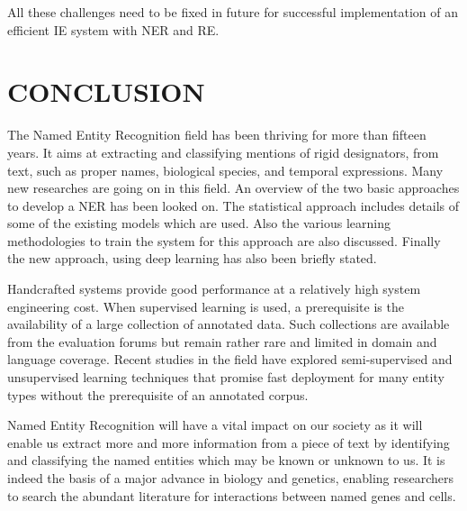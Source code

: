 \documentclass[12pt,a4paper,final]{extreport}
\begin{document}
\vspace{0.5cm}
All these challenges need to be fixed in future for successful implementation of an efficient IE system with NER and RE.
\newpage
\chapter{CONCLUSION}
The Named Entity Recognition field has been thriving for more than fifteen years. It aims at extracting and classifying mentions of rigid designators, from text, such as proper names, biological species, and temporal expressions. Many new researches are going on in this field. An overview of the two basic approaches to develop a NER has been looked on. The statistical approach includes details of some of the existing models which are used. Also the various learning methodologies to train the system for this approach are also discussed. Finally the new approach, using deep learning has also been briefly stated. 

\vspace{0.5cm}
Handcrafted systems provide good performance at a relatively high system engineering cost. When supervised learning is used, a prerequisite is the availability of a large collection of annotated data. Such collections are available from the evaluation forums but remain rather rare and limited in domain and language coverage. Recent studies in the field have explored semi-supervised and unsupervised learning techniques that promise fast deployment for many entity types without the prerequisite of an annotated corpus.
 
\vspace{0.5cm}
Named Entity Recognition will have a vital impact on our society as it will enable us extract more and more information from a piece of text by identifying and classifying the named entities which may be known or unknown to us. It is indeed the basis of a major advance in biology and genetics, enabling researchers to search the abundant literature for interactions between named genes and cells.
\end{document}

